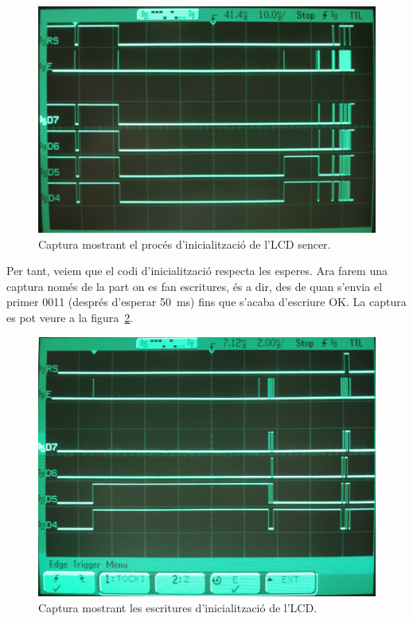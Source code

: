 \begin{figure}
  \begin{center}
    \includegraphics[width=1\columnwidth]{../photos/analyzer/lcd-init-full-1}
  \end{center}
  \caption{ \label{fig:p4-analyzer-lcd-init} Captura mostrant el procés d'inicialització de l'LCD sencer. }
\end{figure}

Per tant, veiem que el codi d'inicialització respecta les esperes. Ara farem una captura només de la part
on es fan escritures, és a dir, des de quan s'envia el primer 0011 (després d'esperar \SI{50}{\milli\second}) fins
que s'acaba d'escriure OK. La captura es pot veure a la figura~\ref{fig:p4-analyzer-lcd-protocol}.

\begin{figure}
  \begin{center}
    \includegraphics[width=1\columnwidth]{../photos/analyzer/lcd-init-z1}
  \end{center}
  \caption{ \label{fig:p4-analyzer-lcd-protocol} Captura mostrant les escritures d'inicialització de l'LCD. }
\end{figure}

